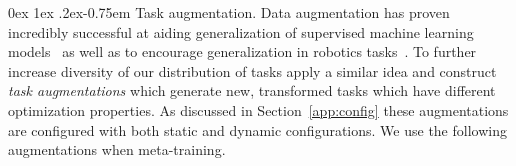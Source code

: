 \documentclass[11pt]{article}
\makeatletter
\renewcommand{\paragraph}{%
  \@startsection{paragraph}{4}%
  {\z@}{0ex \@plus 1ex \@minus .2ex}{-0.75em}%
  {\normalfont\normalsize\bfseries}%
}
\makeatother
\begin{document}
\paragraph{Task augmentation.} Data augmentation has proven incredibly successful at aiding generalization of supervised machine learning models~\citep{perez2017effectiveness}
as well as to encourage generalization in robotics tasks~\citep{sadeghi2016cad2rl,james20163d,tobin2017domain}.
To further increase diversity of our distribution of tasks apply a similar idea and construct \textit{task augmentations} which generate new, transformed tasks which have different optimization properties. As discussed in Section~\ref{app:config} these augmentations are configured with both static and dynamic configurations. We use the following augmentations when meta-training.
\vspace{1em}
\end{document}
